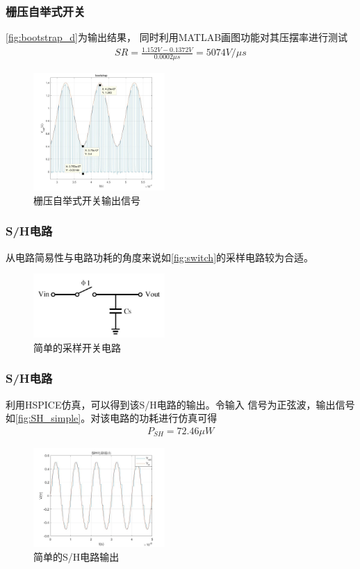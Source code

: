 \documentclass[10pt, mathserif]{beamer}	%
\newcommand{\ftitle}[1]{\frametitle{#1}}	%
\begin{document}
	\begin{frame}
		\ftitle{栅压自举式开关}
		\par \autoref{fig:bootstrap_d}为输出结果，
		同时利用MATLAB画图功能对其压摆率进行测试
		\begin{align}
			SR = \frac{1.152V-0.1372V}{0.0002\mu s} = 5074V/\mu s
		\end{align}
		\begin{figure}[H]
			\centering
			\includegraphics[width=5cm]{bootstrap_d}
			\caption{\label{fig:bootstrap_d}栅压自举式开关输出信号}
		\end{figure}
	\end{frame}

	\begin{frame}
		\ftitle{S/H电路}
		\par 从电路简易性与电路功耗的角度来说如\autoref{fig:switch}的采样电路较为合适。
		\begin{figure}[H]
			\centering
			\includegraphics[width=5cm]{switch}
			\caption{\label{fig:switch}简单的采样开关电路}
		\end{figure}		
	\end{frame}

	\begin{frame}
		\ftitle{S/H电路}
		\par 利用HSPICE仿真，可以得到该S/H电路的输出。令输入
		信号为正弦波，输出信号如\autoref{fig:SH_simple}。对该电路的功耗进行仿真可得
		\begin{align}
			P_{SH} = 72.46\mu W
		\end{align}	
		\begin{figure}[H]
			\centering
			\includegraphics[width=5cm]{SH_simple}
			\caption{\label{fig:SH_simple}简单的S/H电路输出}
		\end{figure}

	\end{frame}
\end{document}

